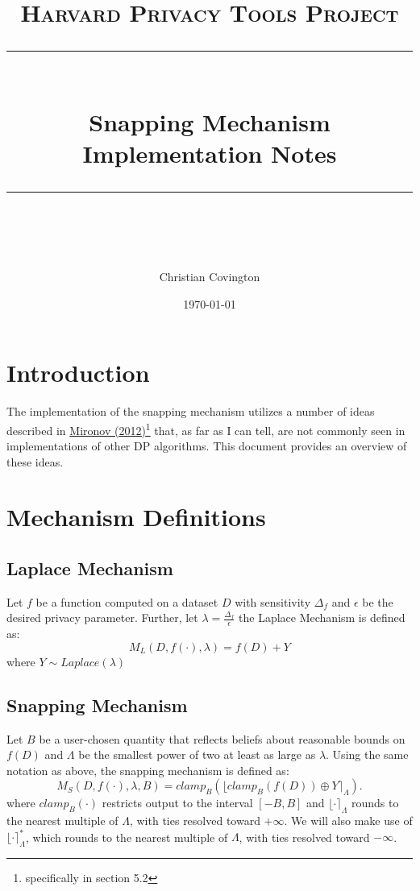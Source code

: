 \documentclass[11pt]{scrartcl} %
\title{
	\normalfont\normalsize
	\textsc{Harvard Privacy Tools Project}\\ %
	\vspace{25pt} %
	\rule{\linewidth}{0.5pt}\\ %
	\vspace{20pt} %
	{\huge Snapping Mechanism Implementation Notes}\\ %
	\vspace{12pt} %
	\rule{\linewidth}{2pt}\\ %
	\vspace{12pt} %
}
\author{\LARGE Christian Covington} %
\date{\normalsize\today} %
\begin{document}
\maketitle %

\section{Introduction}
The implementation of the snapping mechanism utilizes a number of ideas described in \href{http://citeseerx.ist.psu.edu/viewdoc/download?doi=10.1.1.366.5957&rep=rep1&type=pdf}{Mironov (2012)}\footnote{specifically in section 5.2} that, as far as I can tell, are not commonly seen in implementations of other DP algorithms. This document provides an overview of these ideas. \newline

\section{Mechanism Definitions}
\subsection{Laplace Mechanism}
Let $f$ be a function computed on a dataset $D$ with sensitivity $\Delta_f$ and $\epsilon$ be the desired privacy parameter. Further, let $\lambda = \frac{\Delta_f}{\epsilon}$ the Laplace Mechanism is defined as:
\[ M_{L}(D, f(\cdot), \lambda) = f(D) + Y \]
where $Y \sim Laplace(\lambda)$

\subsection{Snapping Mechanism}
Let $B$ be a user-chosen quantity that reflects beliefs about reasonable bounds on $f(D)$ and $\Lambda$ be the smallest power of two at least as large as $\lambda$. Using the same notation as above, the snapping mechanism is defined as:
\[ M_{S}(D, f(\cdot), \lambda, B) = clamp_{B}\left( \lfloor clamp_{B}\left( f(D) \right) \oplus Y \rceil_{\Lambda} \right). \]
where $clamp_{B}(\cdot)$ restricts output to the interval $[-B, B]$ and $\lfloor \cdot \rceil_{\Lambda}$ rounds to the nearest multiple of $\Lambda$, with ties resolved toward $+ \infty$. We will also make use of $\lfloor \cdot \rceil^{*}_{\Lambda}$, which rounds to the nearest multiple of $\Lambda$, with ties resolved toward $- \infty$. \newline
\end{document}
